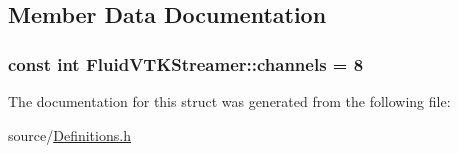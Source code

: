 \subsection{Member Data Documentation}
\hypertarget{struct_fluid_v_t_k_streamer_adcb0db4a89f427581c00828b0029f6b1}{}
\subsubsection[{channels}]{\setlength{\rightskip}{0pt plus 5cm}const int Fluid\+V\+T\+K\+Streamer\+::channels = 8\hspace{0.3cm}{\ttfamily [static]}}\label{struct_fluid_v_t_k_streamer_adcb0db4a89f427581c00828b0029f6b1}


The documentation for this struct was generated from the following file\+:\begin{DoxyCompactItemize}
\item 
source/\hyperlink{_definitions_8h}{Definitions.\+h}\end{DoxyCompactItemize}
